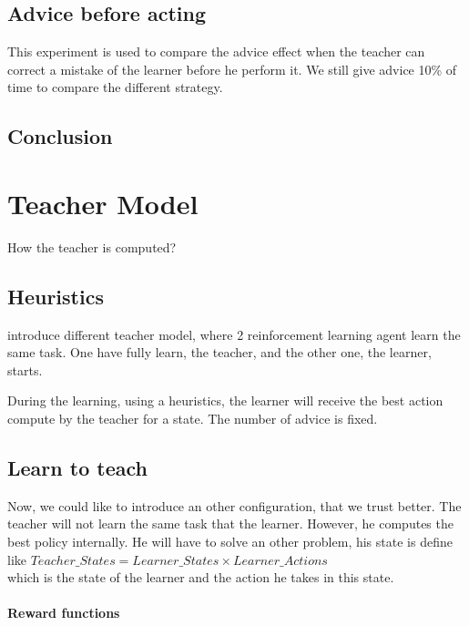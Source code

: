 \documentclass[a4paper,12pt]{article}
\begin{document}
      \subsection{Advice before acting}
      
      This experiment is used to compare the advice effect when the teacher can correct a mistake of the 
      learner before he perform it.
      We still give advice 10\% of time to compare the different strategy.
      
      
      \subsection{Conclusion}
      
      \section{Teacher Model}
      
      How the teacher is computed?
      
      \subsection{Heuristics}
      
      \cite{Torrey:2013:TBA:2484920.2485086} introduce different teacher model, where 2 reinforcement learning agent
      learn the same task. One have fully learn, the teacher, and the other one, the learner, starts.
      
      During the learning, using a heuristics, the learner will receive the best action compute by the teacher
      for a state. The number of advice is fixed.
      
      \subsection{Learn to teach}
      
      Now, we could like to introduce an other configuration, that we trust better.
      The teacher will not learn the same task that the learner. However, he computes the best policy internally. 
      He will have to solve an other problem, his state is define like 
      $Teacher\_States = Learner\_States \times Learner\_Actions$\\
      which is the state of the learner and the action he takes in this state.
      
      \paragraph{Reward functions}
      
\end{document}
